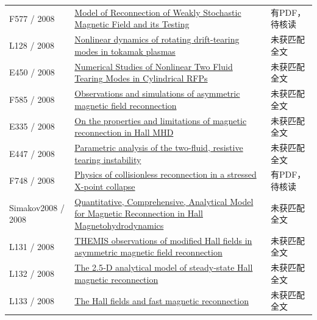 \documentclass[UTF8,a4paper,11pt,openany,fontset=fandol]{ctexbook}
\begin{document}
\begin{longtable}{P{24mm}P{97mm}P{27mm}}
F577 / 2008 & \href{https://doi.org/10.48550/arxiv.0812.4579}{Model of Reconnection of Weakly Stochastic Magnetic Field and its Testing} & 有PDF，待核读\\

L128 / 2008 & \href{https://doi.org/10.1063/1.2980286}{Nonlinear dynamics of rotating drift-tearing modes in tokamak plasmas} & 未获匹配全文\\

E450 / 2008 & \href{http://absimage.aps.org/image/DPP08/MWS_DPP08-2008-000738.pdf}{Numerical Studies of Nonlinear Two Fluid Tearing Modes in Cylindrical RFPs} & 未获匹配全文\\

F585 / 2008 & \href{https://doi.org/10.1029/2008ja013535}{Observations and simulations of asymmetric magnetic field reconnection} & 未获匹配全文\\

E335 / 2008 & \href{https://ui.adsabs.harvard.edu/abs/2008AGUFMSM23C..05C/abstract}{On the properties and limitations of magnetic reconnection in Hall MHD} & 未获匹配全文\\

E447 / 2008 & \href{http://absimage.aps.org/image/DPP08/MWS_DPP08-2008-001107.pdf}{Parametric analysis of the two-fluid,  resistive tearing instability} & 未获匹配全文\\

F748 / 2008 & \href{https://doi.org/10.1063/1.2999532}{Physics of collisionless reconnection in a stressed X-point collapse} & 有PDF，待核读\\

Simakov2008 / 2008 & \href{https://doi.org/10.1103/physrevlett.101.105003}{Quantitative,  Comprehensive,  Analytical Model for Magnetic Reconnection in Hall Magnetohydrodynamics} & 未获匹配全文\\

L131 / 2008 & \href{https://doi.org/10.1029/2007gl033033}{THEMIS observations of modified Hall fields in asymmetric magnetic field reconnection} & 未获匹配全文\\

L132 / 2008 & \href{https://doi.org/10.1029/2007ja012852}{The 2.5‐D analytical model of steady‐state Hall magnetic reconnection} & 未获匹配全文\\

L133 / 2008 & \href{https://doi.org/10.1063/1.2901194}{The Hall fields and fast magnetic reconnection} & 未获匹配全文\\


\end{longtable}
\end{document}
